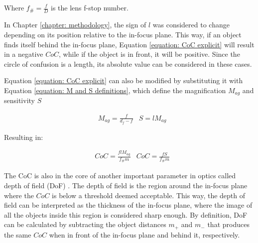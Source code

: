 Where $f_\# = \frac{f}{D}$ is the lens f-stop number.

\par In Chapter \ref{chapter: methodology}, the sign of $l$ was considered to change depending on its position relative to the in-focus plane. This way, if an object finds itself behind the in-focus plane, Equation \ref{equation: CoC explicit} will result in a negative $CoC$, while if the object is in front, it will be positive. Since the circle of confusion is a length, its absolute value can be considered in these cases.

\par Equation \ref{equation: CoC explicit} can also be modified by substituting it with Equation \ref{equation: M and S definitions}, which define the magnification $M_{ag}$ and sensitivity $S$

\begin{align}
        \label{equation: M and S definitions}
        &M_{ag} = \frac{f}{d_f-f} & S = lM_{ag}
\end{align}

Resulting in:

\begin{align}
    \label{equation: CoC in M and S}
    & CoC = \frac{flM_{ag}}{f_\#m} & CoC = \frac{fS}{f_\#m}
\end{align}

The CoC is also in the core of another important parameter in optics called depth of field (DoF) \cite{Greenleaf1950}. The depth of field is the region around the in-focus plane where the $CoC$ is below a threshold deemed acceptable. This way, the depth of field can be interpreted as the thickness of the in-focus plane, where the image of all the objects inside this region is considered sharp enough. By definition, DoF can be calculated by subtracting the object distances $m_+$ and $m_-$ that produces the same $CoC$ when in front of the in-focus plane and behind it, respectively.
